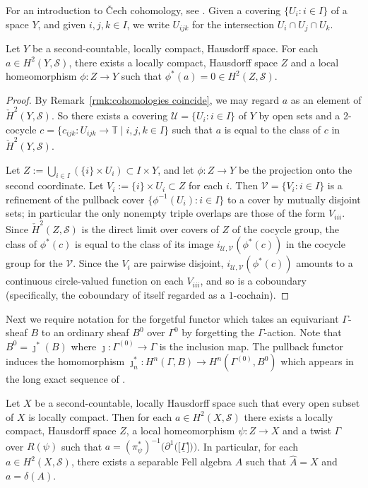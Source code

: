 \documentclass[12pt,a4paper]{amsart}
\newcommand{\field}[1]{\mathbb{#1}}
\newcommand{\TT}{\field{T}}
\newcommand{\Tgerms}{\mathcal{S}}
\begin{document}
For an introduction to \v{C}ech cohomology, see
\cite[Chapter~4]{tfb}. Given a covering $\{U_i : i \in I\}$ of a
space $Y$, and given $i,j,k \in I$, we write $U_{ijk}$ for the
intersection $U_i \cap U_j \cap U_k$.

\begin{lemma}\label{lem:pullback to trivialise}
Let $Y$ be a second-countable, locally compact, Hausdorff space.
For each $a \in H^2(Y, \Tgerms)$, there exists a locally
compact, Hausdorff space $Z$ and a local homeomorphism $\phi : Z
\to Y$ such that $\phi^*(a) = 0 \in H^2(Z, \Tgerms)$.
\end{lemma}
\begin{proof}
By Remark~\ref{rmk:cohomologies coincide}, we may regard $a$ as
an element of $\check{H}^2(Y, \Tgerms)$. So there exists a
covering $\mathcal{U} = \{U_i : i \in I\}$ of $Y$ by open sets
and a 2-cocycle $c = \{c_{ijk} : U_{ijk} \to \TT \mid i,j,k \in
I\}$ such that $a$ is equal to the class of $c$ in
$\check{H}^2(Y, \Tgerms)$.

Let $Z := \bigcup_{i \in I} (\{i\} \times U_i) \subset I \times
Y$, and let $\phi : Z \to Y$ be the projection onto the second
coordinate. Let $V_i := \{i\} \times U_i \subset Z$ for each
$i$. Then $\mathcal{V} = \{V_i : i \in I\}$ is a refinement of
the pullback cover $\{\phi^{-1}(U_i) : i \in I\}$ to a cover by
mutually disjoint sets; in particular the only nonempty triple
overlaps are those of the form $V_{iii}$. Since $\check{H}^2(Z,
\Tgerms)$ is the direct limit over covers of $Z$ of the cocycle
group, the class of $\phi^*(c)$ is equal to the class of its
image $i_{\mathcal{U}, \mathcal{V}}(\phi^*(c))$ in the cocycle
group for the $\mathcal{V}$. Since the $V_i$ are pairwise
disjoint, $i_{\mathcal{U}, \mathcal{V}}(\phi^*(c))$ amounts to
a continuous circle-valued function on each $V_{iii}$, and so
is a coboundary (specifically, the coboundary of itself
regarded as a $1$-cochain).
\end{proof}

Next we  require notation for the
forgetful functor which takes an equivariant $\Gamma$-sheaf
$B$ to an ordinary sheaf $B^0$ over $\Gamma^0$ by forgetting
the $\Gamma$-action. Note that  $B^0 = \jmath^*(B)$ where
$\jmath : \Gamma^{(0)} \to \Gamma$ is the inclusion map.
The pullback functor induces the homomorphism
$\jmath^*_n: H^n(\Gamma, B)\to H^n(\Gamma^{(0)}, B^0)$ which
appears in the long exact sequence of
\cite[Theorem~3.7]{Kumjian1988}.

\begin{prop}\label{prop:invariant exhausted}
Let $X$ be a second-countable, locally Hausdorff space such
that every open subset of $X$ is locally compact. Then for each
$a \in H^2(X,\Tgerms)$ there exists a locally compact,
Hausdorff space $Z$, a local homeomorphism $\psi : Z \to X$ and
a twist $\Gamma$ over $R(\psi)$ such that $a =
(\pi_\psi^*)^{-1}\big(\partial^1\big(\!\big[\underline{\Gamma}\big]\!\big)\big)$.
In particular, for each $a \in H^2(X,\Tgerms)$, there exists a
separable Fell algebra $A$  such that $\widehat{A} = X$ and $a = \delta(A)$.
\end{prop}
\end{document}

